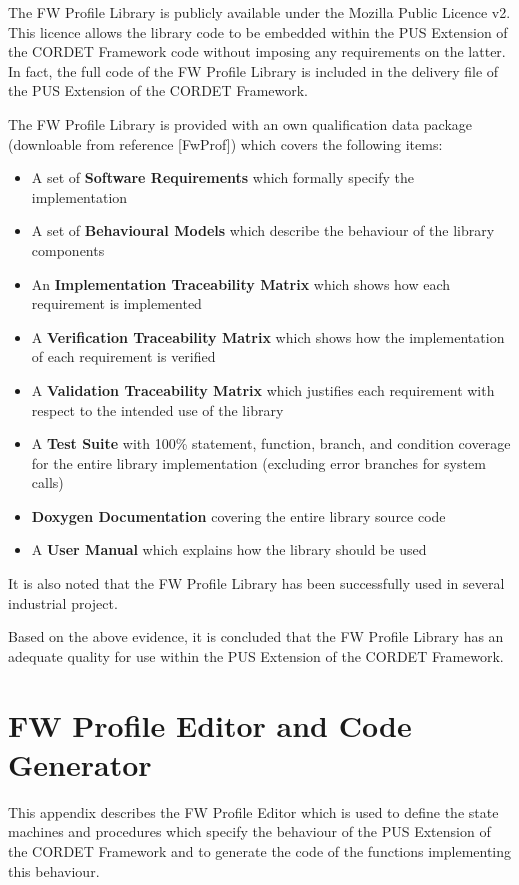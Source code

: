 \documentclass{pnp_article}
\begin{document}
The FW Profile Library is publicly available under the Mozilla Public Licence v2. This licence allows the library code to be embedded within the PUS Extension of the CORDET Framework code without imposing any requirements on the latter. In fact, the full code of the FW Profile Library is included in the delivery file of the PUS Extension of the CORDET Framework.

The FW Profile Library is provided with an own qualification data package (downloable from reference [FwProf]) which covers the following items:

\begin{itemize}
\item A set of \textbf{Software Requirements} which formally specify the implementation
\item A set of \textbf{Behavioural Models} which describe the behaviour of the library components
\item An \textbf{Implementation Traceability Matrix} which shows how each requirement is implemented
\item A \textbf{Verification Traceability Matrix} which shows how the implementation of each requirement is verified
\item A \textbf{Validation Traceability Matrix} which justifies each requirement with respect to the intended use of the library
\item A \textbf{Test Suite} with 100\% statement, function, branch, and condition coverage for the entire library implementation (excluding error branches for system calls)
\item \textbf{Doxygen Documentation} covering the entire library source code
\item A \textbf{User Manual} which explains how the library should be used
\end{itemize}

It is also noted that the FW Profile Library has been successfully used in several industrial project.

Based on the above evidence, it is concluded that the FW Profile Library has an adequate quality for use within the PUS Extension of the CORDET Framework.




\newpage
\appendix
\section{FW Profile Editor and Code Generator}\label{sec:svrFwProfEd}
This appendix describes the FW Profile Editor which is used to define the state machines and procedures which specify the behaviour of the PUS Extension of the CORDET Framework and to generate the code of the functions implementing this behaviour.
\end{document}
